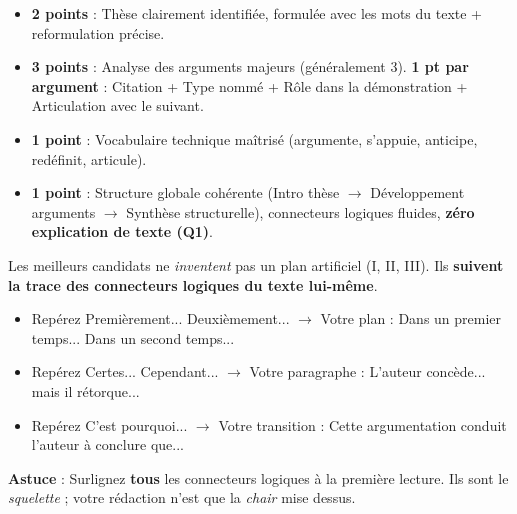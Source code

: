 \documentclass[11pt]{article}
\begin{document}
\begin{aretenir}
\begin{itemize}
    \item \textbf{2 points} : Thèse clairement identifiée, formulée avec les mots du texte + reformulation précise.
    \item \textbf{3 points} : Analyse des arguments majeurs (généralement 3). \textbf{1 pt par argument} : Citation + Type nommé + Rôle dans la démonstration + Articulation avec le suivant.
    \item \textbf{1 point} : Vocabulaire technique maîtrisé (\og{}argumente\fg{}, \og{}s'appuie\fg{}, \og{}anticipe\fg{}, \og{}redéfinit\fg{}, \og{}articule\fg{}).
    \item \textbf{1 point} : Structure globale cohérente (Intro thèse $\rightarrow$ Développement arguments $\rightarrow$ Synthèse structurelle), connecteurs logiques fluides, \textbf{zéro explication de texte (Q1)}.
\end{itemize}
\end{aretenir}

\begin{savaistu}[Le secret des 7/7 : Les connecteurs du texte = Votre plan]
Les meilleurs candidats ne \emph{inventent} pas un plan artificiel (I, II, III). Ils \textbf{suivent la trace des connecteurs logiques du texte lui-même}.
\begin{itemize}
    \item Repérez \og{}Premièrement... Deuxièmement...\fg{} $\rightarrow$ Votre plan : \og{}Dans un premier temps... Dans un second temps...\fg{}
    \item Repérez \og{}Certes... Cependant...\fg{} $\rightarrow$ Votre paragraphe : \og{}L'auteur concède... mais il rétorque...\fg{}
    \item Repérez \og{}C'est pourquoi...\fg{} $\rightarrow$ Votre transition : \og{}Cette argumentation conduit l'auteur à conclure que...\fg{}
\end{itemize}
\textbf{Astuce} : Surlignez \textbf{tous} les connecteurs logiques à la première lecture. Ils sont le \emph{squelette} ; votre rédaction n'est que la \emph{chair} mise dessus.
\end{savaistu}
\end{document}
